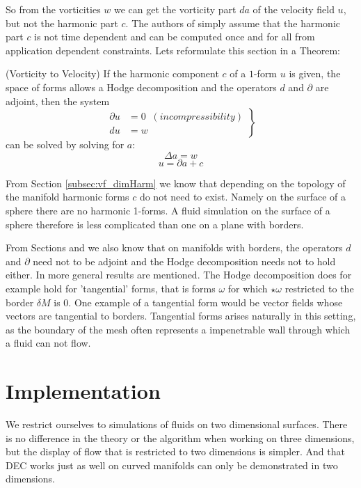 So from the vorticities $w$ we can get the vorticity part $da$ of the velocity field $u$, but not the harmonic part $c$. The authors of \note{[...]} simply assume that the harmonic part $c$ is not time dependent and can be computed once and for all from application dependent constraints. Lets reformulate this section in a Theorem:

\begin{thm} \label{thm:vort2vel}(Vorticity to Velocity) If the harmonic component $c$ of a $1$-form $u$ is given, the space of forms allows a Hodge decomposition and the operators $d$ and $\partial$ are adjoint, then the system
\begin{equation}\left.\begin{aligned}\partial u &= 0 \;\; (incompressibility) \\ 
du &= w \end{aligned}\right\}\end{equation}
can be solved by solving for $a$:
\[\Delta a = w\]
\[u = \partial a + c\]
\end{thm}

From Section \ref{subsec:vf_dimHarm} we know that depending on the topology of the manifold harmonic forms $c$ do not need to exist. Namely on the surface of a sphere there are no harmonic 1-forms. A fluid simulation on the surface of a sphere therefore is less complicated than one on a plane with borders. 

From Sections \note{[coderiv]} and  we also know that on manifolds with borders, the operators $d$ and $\partial$ need not to be adjoint and the Hodge decomposition needs not to hold either. In  more general results are mentioned. The Hodge decomposition does for example hold for 'tangential' forms, that is forms $\omega$ for which $\star\omega$ restricted to the border $\delta M$ is 0. One example of a tangential form would be vector fields whose vectors are tangential to borders. Tangential forms arises naturally in this setting, as the boundary of the mesh often represents a impenetrable wall through which a fluid can not flow.

\section{Implementation}
We restrict ourselves to simulations of fluids on two dimensional surfaces. There is no difference in the theory or the algorithm when working on three dimensions, but the display of flow that is restricted to two dimensions is simpler. And that DEC works just as well on curved manifolds can only be demonstrated in two dimensions. 

